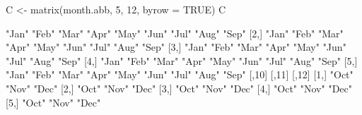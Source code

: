 \begin{Schunk}
\begin{Sinput}
 C <- matrix(month.abb, 5, 12, byrow = TRUE)
 C
\end{Sinput}
\begin{Soutput}
     [,1]  [,2]  [,3]  [,4]  [,5]  [,6]  [,7]  [,8]  [,9] 
[1,] "Jan" "Feb" "Mar" "Apr" "May" "Jun" "Jul" "Aug" "Sep"
[2,] "Jan" "Feb" "Mar" "Apr" "May" "Jun" "Jul" "Aug" "Sep"
[3,] "Jan" "Feb" "Mar" "Apr" "May" "Jun" "Jul" "Aug" "Sep"
[4,] "Jan" "Feb" "Mar" "Apr" "May" "Jun" "Jul" "Aug" "Sep"
[5,] "Jan" "Feb" "Mar" "Apr" "May" "Jun" "Jul" "Aug" "Sep"
     [,10] [,11] [,12]
[1,] "Oct" "Nov" "Dec"
[2,] "Oct" "Nov" "Dec"
[3,] "Oct" "Nov" "Dec"
[4,] "Oct" "Nov" "Dec"
[5,] "Oct" "Nov" "Dec"
\end{Soutput}
\end{Schunk}
